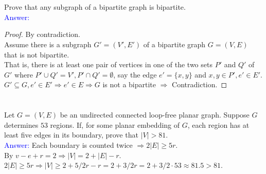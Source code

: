 \documentclass[a4paper]{article}
\begin{document}
\section{}
Prove that any subgraph of a bipartite graph is bipartite. \\
\textcolor{blue}{Answer:} 
\begin{proof} By contradiction.\\
Assume there is a subgraph $G'=(V',E')$ of a bipartite graph $G=(V,E)$ that is not bipartite.\\
That is, there is at least one pair of vertices in one of the two sets $P'$ and $Q'$ of $G'$ where $P'\cup Q'=V', P'\cap Q'=\emptyset$, say the edge $e'=\{x,y\}$ and $x,y\in P',e'\in E'$.\\
$G'\subseteq G, e'\in E'\Rightarrow e'\in E\Rightarrow G$ is not a bipartite $\Rightarrow$ Contradiction.
\end{proof}

\section{}
Let $G =(V,E)$ be an undirected connected loop-free planar graph. Suppose $G$ determines $53$ regions. If, for some planar embedding of $G$, each region has at least five edges in its boundary, prove that $|V| > 81$.\\
\textcolor{blue}{Answer:} 
Each boundary is counted twice $\Rightarrow 2|E|\geq 5r$.\\
By $v-e+r=2\Rightarrow |V|=2+|E|-r$.\\
$2|E|\geq 5r\Rightarrow |V|\geq 2+5/2r-r=2+3/2r=2+3/2\cdot 53\approx81.5>81$.
\end{document}
